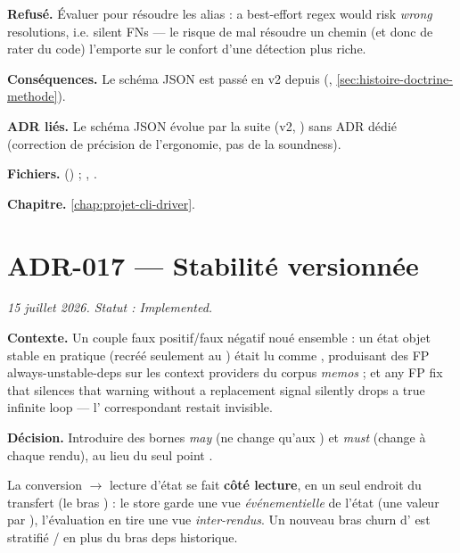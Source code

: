 \textbf{Refusé.} Évaluer  pour résoudre les alias :
\og a best-effort regex would risk \emph{wrong} resolutions, i.e. silent
FNs\fg{} --- le risque de mal résoudre un chemin (et donc de rater du code)
l'emporte sur le confort d'une détection plus riche.

\textbf{Conséquences.} Le schéma JSON est passé en v2 depuis (,
\cref{sec:histoire-doctrine-methode}).

\textbf{ADR liés.} Le schéma JSON évolue par la suite (v2, ) sans
ADR dédié (correction de précision de l'ergonomie, pas de la soundness).

\textbf{Fichiers.}  () ;
, .

\textbf{Chapitre.} \cref{chap:projet-cli-driver}.

\section{ADR-017 --- Stabilité versionnée}
\label{adr:17}
\noindent\textit{15 juillet 2026. Statut : Implemented.}

\textbf{Contexte.} Un couple faux positif/faux négatif noué ensemble : un
état objet stable en pratique (recréé seulement au ) était lu
comme , produisant des FP \og always-unstable-deps\fg{} sur les
context providers du corpus \emph{memos} ; et \og any FP fix that silences
that warning without a replacement signal silently drops a true infinite
loop\fg{} --- l' correspondant restait invisible.

\textbf{Décision.} Introduire des bornes \emph{may} (\og ne change qu'aux
 \fg{}) et \emph{must} (\og change à chaque rendu\fg{}), au lieu du
seul point .


La conversion  $\to$ lecture d'état se fait \textbf{côté
lecture}, en un seul endroit du transfert (le bras ) :
le store garde une vue \emph{événementielle} de l'état (une valeur par
), l'évaluation en tire une vue \emph{inter-rendus}. Un nouveau bras
\og churn\fg{} d' est stratifié \Error{}/\Warning{} en
plus du bras \og deps\fg{} historique.

